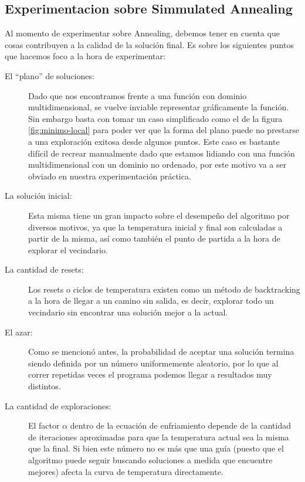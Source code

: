 \subsection{Experimentacion sobre Simmulated Annealing}

Al momento de experimentar sobre Annealing, debemos tener en cuenta que cosas contribuyen a la calidad de la solución final. Es sobre los siguientes puntos que hacemos foco a la hora de experimentar:

\begin{description}
\item[El “plano” de soluciones:] Dado que nos encontramos frente a una función con dominio multidimensional, se vuelve inviable representar gráficamente la función. Sin embargo basta con tomar un caso simplificado como el de la figura \ref{fig:minimo-local} para poder ver que la forma del plano puede no prestarse a una exploración exitosa desde algunos puntos. Este caso es bastante difícil de recrear manualmente dado que estamos lidiando con una función multidimensional con un dominio no ordenado, por este motivo va a ser obviado en nuestra experimentación práctica.

\item[La solución inicial:] Esta misma tiene un gran impacto sobre el desempeño del algoritmo por diversos motivos, ya que la temperatura inicial y final son calculadas a partir de la misma, así como también el punto de partida a la hora de explorar el vecindario. 

\item[La cantidad de resets:] Los resets o ciclos de temperatura existen como un método de backtracking a la hora de llegar a un camino sin salida, es decir, explorar todo un vecindario sin encontrar una solución mejor a la actual.

\item[El azar:] Como se mencionó antes, la probabilidad de aceptar una solución termina siendo definida por un número uniformemente aleatorio, por lo que al correr repetidas veces el programa podemos llegar a resultados muy distintos.

\item[La cantidad de exploraciones:] El factor $\alpha$ dentro de la ecuación de enfriamiento depende de la cantidad de iteraciones aproximadas para que la temperatura actual sea la misma que la final. Si bien este número no es más que una guía (puesto que el algoritmo puede seguir buscando soluciones a medida que encuentre mejores) afecta la curva de temperatura directamente. 

\end{description}


